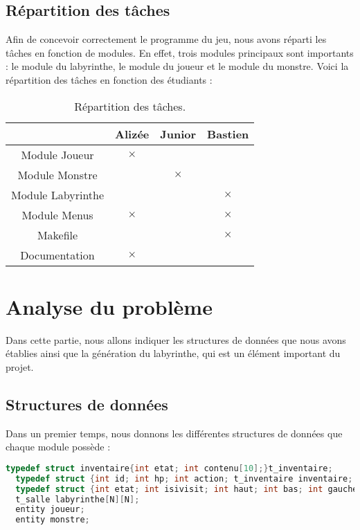 \documentclass[a4paper,11pt]{report}
\begin{document}
    \section{Répartition des tâches}
    Afin de concevoir correctement le programme du jeu, nous avons réparti les tâches en fonction de modules. En effet, trois modules principaux sont importants : le module du labyrinthe, le module du joueur et le module du monstre. Voici la répartition des tâches en fonction des étudiants :
      \begin{table}[htbp]
        \center
        \caption{Répartition des tâches.}
          \begin{tabular}{|c|c c c|}
            \hline 
                                   &Alizée       &Junior       &Bastien      \\
            \hline
                Module Joueur      &$\times$     &             &             \\
                Module Monstre     &             &$\times$     &             \\
                Module Labyrinthe  &             &             &$\times$     \\
                Module Menus	   &$\times$	 &			   &$\times$	 \\
                Makefile           &             &		       &$\times$     \\
                Documentation      &$\times$     &             &             \\
                
            \hline
          \end{tabular}
      \end{table}

  \chapter{Analyse du problème}
  Dans cette partie, nous allons indiquer les structures de données que nous avons établies ainsi que la génération du labyrinthe, qui est un élément important du projet.
    \section{Structures de données}
    Dans un premier temps, nous donnons les différentes structures de données que chaque module possède :
\begin{lstlisting}[language=c]
  typedef struct inventaire{int etat; int contenu[10];}t_inventaire;
  typedef struct {int id; int hp; int action; t_inventaire inventaire; int orientation;}entity;
  typedef struct {int etat; int isivisit; int haut; int bas; int gauche; int droite; t_inventaire objets; entity entite;}t_salle;
  t_salle labyrinthe[N][N];
  entity joueur;
  entity monstre;
\end{lstlisting}
\end{document}

